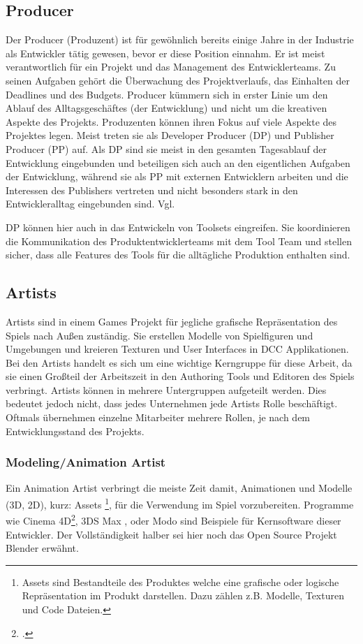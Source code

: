 \documentclass[pagesize, paper=a4, fontsize=12pt, titlepage=true, headings=small, headnosepline, abstractoff, liststotoc, nochapterprefix, plainheadsepline, twoside]{scrreprt}
\begin{document}
\subsection{Producer}
Der Producer (Produzent) ist für gewöhnlich bereits einige Jahre in der Industrie als Entwickler tätig gewesen, bevor er diese Position einnahm. Er ist meist verantwortlich für ein Projekt und das Management des Entwicklerteams. Zu seinen Aufgaben gehört die Überwachung des Projektverlaufs, das Einhalten der Deadlines und des Budgets. Producer kümmern sich in erster Linie um den Ablauf des Alltagsgeschäftes (der Entwicklung) und nicht um die kreativen Aspekte des Projekts. Produzenten können ihren Fokus auf viele Aspekte des Projektes legen. Meist treten sie als Developer Producer (DP) und Publisher Producer (PP) auf. Als DP sind sie meist in den gesamten Tagesablauf der Entwicklung eingebunden und beteiligen sich auch an den eigentlichen Aufgaben der Entwicklung, während sie als PP mit externen Entwicklern arbeiten und die Interessen des Publishers vertreten und nicht besonders stark in den Entwickleralltag eingebunden sind. Vgl. 

DP können hier auch in das Entwickeln von Toolsets eingreifen. Sie koordinieren die Kommunikation des Produktentwicklerteams mit dem Tool Team und stellen sicher, dass alle Features des Tools für die alltägliche Produktion enthalten sind.

\subsection{Artists}
Artists sind in einem Games Projekt für jegliche grafische Repräsentation des Spiels nach Außen zuständig. Sie erstellen Modelle von Spielfiguren und Umgebungen und kreieren Texturen und User Interfaces in DCC Applikationen. Bei den Artists handelt es sich um eine wichtige Kerngruppe für diese Arbeit, da sie einen Großteil der Arbeitszeit in den Authoring Tools und Editoren des Spiels verbringt. Artists können in mehrere Untergruppen aufgeteilt werden. Dies bedeutet jedoch nicht, dass jedes Unternehmen jede Artists Rolle beschäftigt. Oftmals übernehmen einzelne Mitarbeiter mehrere Rollen, je nach dem Entwicklungsstand des Projekts.

\subsubsection{Modeling/Animation Artist}
Ein Animation Artist verbringt die meiste Zeit damit, Animationen und Modelle (3D, 2D), kurz: Assets \footnote{Assets sind Bestandteile des Produktes welche eine grafische oder logische Repräsentation im Produkt darstellen. Dazu zählen z.B. Modelle, Texturen und Code Dateien.}, für die Verwendung im Spiel vorzubereiten. Programme wie Cinema 4D\footcite{MaxonC4d2014}, 3DS Max \parencite{AutodeskMax2014}, oder Modo\parencite{FoundryModo2014} sind Beispiele für Kernsoftware dieser Entwickler. Der Vollständigkeit halber sei hier noch das Open Source Projekt Blender \parencite{Blender2015} erwähnt.
\end{document}
